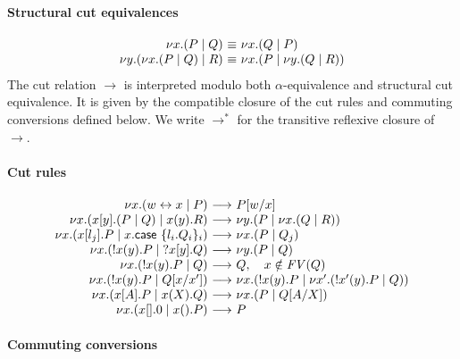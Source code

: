 \documentclass{easychair}
\makeatletter
\newcommand{\ba}{\begin{array}}
\newcommand{\ea}{\end{array}}
\newenvironment{equations}{\[\ba{@{}r@{~}c@{~}l@{}}}{\ea\]}
\newcommand{\key}{\mathsf}
\newcommand{\set}[1]{\{ #1 \}}
\newcommand{\row}[2]{\set{#1}_{#2}}
\newcommand{\la}{l}
\newcommand{\cpLink}[2]{{#1} \leftrightarrow {#2}}
\newcommand{\cpCut}[3]{\nu {#1}.({#2} \mid {#3})}
\newcommand{\cpOutput}[4]{{#1}[{#2}].({#3} \mid {#4})}
\newcommand{\cpInput}[3]{{#1}({#2}).{#3}}
\newcommand{\cpInject}[3]{{#1}[{#2}].{#3}}
\newcommand{\cpCase}[2]{{#1}.\key{case}~{#2}}
\newcommand{\cpServe}[3]{!{#1}({#2}).{#3}}
\newcommand{\cpRequest}[3]{?{#1}[{#2}].{#3}}
\newcommand{\cpEmptyOut}[1]{{#1}[].0}
\newcommand{\cpEmptyIn}[2]{{#1}().{#2}}
\newcommand{\cpSendType}[3]{{#1}[{#2}].{#3}}
\newcommand{\cpReceiveType}[3]{{#1}({#2}).{#3}}
\newcommand{\FV}[1]{\mathit{FV}(#1)}
\newcommand{\subst}[3]{{#1}[{#2}/{#3}]}
\newcommand{\redto}{\longrightarrow}
\newcommand{\eqto}{\equiv}
\makeatother
\begin{document}
\paragraph{Structural cut equivalences}

\begin{equations}
\cpCut{x}{P}{Q} &\eqto& \cpCut{x}{Q}{P} \\
\cpCut{y}{\cpCut{x}{P}{Q}}{R} &\eqto& \cpCut{x}{P}{\cpCut{y}{Q}{R}} \\
\end{equations}%
%
The cut relation $\redto$ is interpreted modulo both $\alpha$-equivalence and structural cut
equivalence. It is given by the compatible closure of the cut rules and commuting conversions
defined below. We write $\redto^*$ for the transitive reflexive closure of $\redto$.

\paragraph{Cut rules}

\begin{equations}
\cpCut{x}{\cpLink{w}{x}}{P}
  &\redto& \subst{P}{w}{x} \\
\cpCut{x}{\cpOutput{x}{y}{P}{Q}}{\cpInput{x}{y}{R}}
  &\redto& \cpCut{y}{P}{\cpCut{x}{Q}{R}} \\
\cpCut{x}{\cpInject{x}{\la_j}{P}}{\cpCase{x}{\row{\la_i.Q_i}{i}}}
  &\redto& \cpCut{x}{P}{Q_j} \\
\cpCut{x}{\cpServe{x}{y}{P}}{\cpRequest{x}{y}{Q}}
  &\redto& \cpCut{y}{P}{Q} \\
\cpCut{x}{\cpServe{x}{y}{P}}{Q}
  &\redto& Q, \quad x \notin \FV{Q} \\
\cpCut{x}{\cpServe{x}{y}{P}}{\subst{Q}{x}{x'}}
  &\redto& \cpCut{x}{\cpServe{x}{y}{P}}{\cpCut{x'}{\cpServe{x'}{y}{P}}{Q}} \\
\cpCut{x}{\cpSendType{x}{A}{P}}{\cpReceiveType{x}{X}{Q}}
  &\redto& \cpCut{x}{P}{\subst{Q}{A}{X}} \\
\cpCut{x}{\cpEmptyOut{x}}{\cpEmptyIn{x}{P}}
  &\redto& P \\
\end{equations}%

\paragraph{Commuting conversions}
\end{document}
